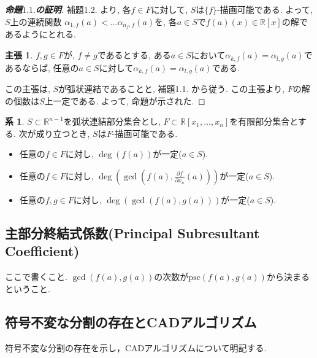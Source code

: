 \documentclass[dvipdfmx]{jsarticle}
\newcommand{\R}{\mathbb{R}}
\theoremstyle{definition}
\newtheorem{corollary}{系}[section]
\newtheorem*{claim*}{主張}
\begin{document}
\begin{proof}[{\bf 命題$1.1.$の証明}]

補題1.2. より, 各$f \in F$に対して, $S$は$\{f\}$-描画可能である.
よって,$S$上の連続関数 $\alpha_{1,f}(a) < \dots \alpha_{n_f, f}(a)$を, 各$a \in S$で$f(a)(x) \in \R[x]$の解であるようにとれる.

\begin{claim*}
$f, g \in F$が, $f \neq g$であるとする,
ある$a \in S$において$\alpha_{k,f}(a) = \alpha_{l,g}(a)$であるならば, 任意の$a \in S$に対して$\alpha_{k,f}(a) = \alpha_{l,g}(a)$である.
\end{claim*}

この主張は, $S$が弧状連結であることと, 補題1.1. から従う. 
この主張より, $F$の解の個数は$S$上一定である. よって, 命題が示された.
\end{proof}

\begin{corollary}
$S \subset \R^{n-1}$を弧状連結部分集合とし, $F \subset \R[x_1,\dots, x_n]$を有限部分集合とする.
次が成り立つとき, $S$は$F$-描画可能である.
\begin{itemize}
\item 任意の$f \in F$に対し, $\deg(f(a))$が一定($a \in S$).
\item 任意の$f \in F$に対し, $\deg(\gcd(f(a), \frac{\partial f}{\partial x_n}(a)))$が一定($a \in S$).
\item 任意の$f, g \in F$に対し, $\deg(\gcd(f(a), g(a)))$が一定($a \in S$).
\end{itemize}
\end{corollary}

\subsection{主部分終結式係数(Principal Subresultant Coefficient)}

ここで書くこと. $\gcd(f(a),g(a))$の次数が$\mathrm{psc}(f(a),g(a))$から決まるということ.


\subsection{符号不変な分割の存在とCADアルゴリズム}
符号不変な分割の存在を示し，CADアルゴリズムについて明記する. 
\end{document}
